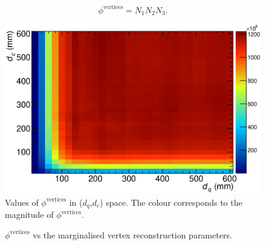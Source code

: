\begin{equation}
  \phi^{\textrm{vertices}} = N_1N_2N_3.
\end{equation}
\begin{figure}
  \centering
  \includegraphics[width=12cm]{images/selection/vertex_recon/FOM_2D}
  \caption{Values of $\phi^{\textrm{vertices}}$ in ($d_q$,$d_c$) space.  The colour corresponds to the magnitude of $\phi^{\textrm{vertices}}$.}
  \label{fig:VertexReconFOM}
\end{figure}
\begin{figure}
  \centering
  \caption{$\phi^{\textrm{vertices}}$ vs the marginalised vertex reconstruction parameters.}
  \label{fig:VertexReconMarginalizedDistributions}
\end{figure}
